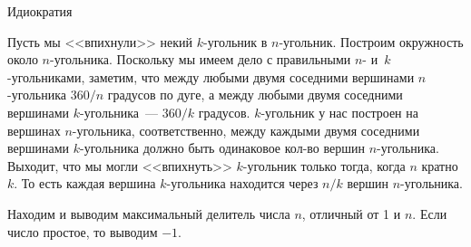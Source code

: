 \begin{tutorial}{Идиократия}

Пусть мы <<впихнули>> некий $k$-угольник в $n$-угольник. Построим окружность около $n$-угольника. Поскольку мы имеем дело с правильными $n$- и~$k$-угольниками, заметим, что между любыми двумя соседними вершинами $n$-угольника $360 / n$ градусов по дуге, а между любыми двумя соседними вершинами $k$-угольника~--- $360 / k$ градусов. $k$-угольник у нас построен на вершинах $n$-угольника, соответственно, между каждыми двумя соседними вершинами $k$-угольника должно быть одинаковое кол-во вершин $n$-угольника. Выходит, что мы могли <<впихнуть>> $k$-угольник только тогда, когда $n$ кратно $k$. То есть каждая вершина $k$-угольника находится через $n / k$ вершин $n$-угольника.

Находим и выводим максимальный делитель числа $n$, отличный от 1 и $n$. Если число простое, то выводим $-1$.

\end{tutorial}
